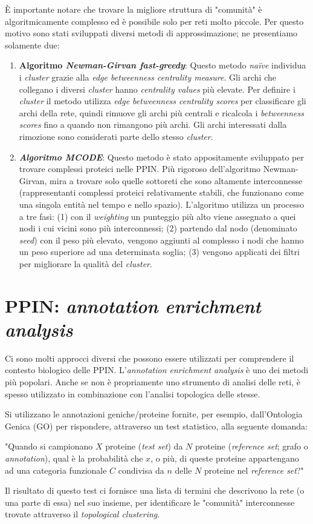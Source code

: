 \documentclass[11pt]{article}
\begin{document}
È importante notare che trovare la migliore struttura di "comunità" è algoritmicamente complesso ed è possibile solo per reti molto piccole. Per questo motivo sono stati sviluppati diversi metodi di approssimazione; ne presentiamo solamente due:
\begin{enumerate}
\item \textbf{Algoritmo \textit{Newman-Girvan fast-greedy}}: Questo metodo \textit{naïve} individua i \textit{cluster} grazie alla \textit{edge betweenness centrality measure}. Gli archi che collegano i diversi \textit{cluster} hanno \textit{centrality values} più elevate. Per definire i \textit{cluster} il metodo utilizza \textit{edge betweenness centrality scores} per classificare gli archi della rete, quindi rimuove gli archi più centrali e ricalcola i \textit{betweenness scores} fino a quando non rimangono più archi. Gli archi interessati dalla rimozione sono considerati parte dello stesso \textit{cluster}.
\item \textit{\textbf{Algoritmo MCODE}}: Questo metodo è stato appositamente sviluppato per trovare complessi proteici nelle PPIN. Più rigoroso dell'algoritmo Newman-Girvan, mira a trovare solo quelle sottoreti che sono altamente interconnesse (rappresentanti complessi proteici relativamente stabili, che funzionano come una singola entità nel tempo e nello spazio).
L'algoritmo utilizza un processo a tre fasi: (1) con il \textit{weighting} un punteggio più alto viene assegnato a quei nodi i cui vicini sono più interconnessi; (2) partendo dal nodo (denominato \textit{seed}) con il peso più elevato, vengono aggiunti al complesso i nodi che hanno un peso superiore ad una determinata soglia; (3) vengono applicati dei filtri per migliorare la qualità del \textit{cluster}.
\end{enumerate}

\section{PPIN: \textit{annotation enrichment analysis}}
Ci sono molti approcci diversi che possono essere utilizzati per comprendere il contesto biologico delle PPIN. L'\textit{annotation enrichment analysis} è uno dei metodi più popolari. Anche se non è propriamente uno strumento di analisi delle reti, è spesso utilizzato in combinazione con l'analisi topologica delle stesse.

Si utilizzano le annotazioni geniche/proteine fornite, per esempio, dall'Ontologia Genica (GO) per rispondere, attraverso un test statistico, alla seguente domanda:
\begin{center}
"Quando si campionano $X$ proteine (\textit{test set}) da $N$ proteine (\textit{reference set}; grafo o \textit{annotation}), qual è la probabilità che $x$, o più, di queste proteine appartengano ad una categoria funzionale $C$ condivisa da $n$ delle $N$ proteine nel \textit{reference set}?"
\end{center}
Il risultato di questo test ci fornisce una lista di termini che descrivono la rete (o una parte di essa) nel suo insieme, per identificare le "comunità" interconnesse trovate attraverso il \textit{topological clustering}.
\end{document}
